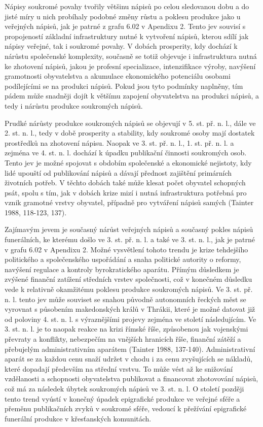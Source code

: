 Nápisy soukromé povahy tvořily většinu nápisů po celou sledovanou dobu a do jisté míry u nich probíhaly podobné změny růstu a poklesu produkce jako u veřejných nápisů, jak je patrné z grafu 6.02 v Apendixu 2. Tento jev souvisí s propojeností základní infrastruktury nutné k vytvoření nápisů, kterou sdílí jak nápisy veřejné, tak i soukromé povahy. V dobách prosperity, kdy dochází k nárůstu společenské komplexity, současně se totiž objevuje i infrastruktura nutná ke zhotovení nápisů, jakou je profesní specializace, intenzifikace výroby, navýšení gramotnosti obyvatelstva a akumulace ekonomického potenciálu osobami podílejícími se na produkci nápisů. Pokud jsou tyto podmínky naplněny, tím pádem může snadněji dojít k většímu zapojení obyvatelstva na produkci nápisů, a tedy i nárůstu produkce soukromých nápisů.

Prudké nárůsty produkce soukromých nápisů se objevují v 5. st. př. n. l., dále ve 2. st. n. l., tedy v době prosperity a stability, kdy soukromé osoby mají dostatek prostředků na zhotovení nápisu. Naopak ve 3. st. př. n. l., 1. st. př. n. l. a zejména ve 4. st. n. l. dochází k úpadku publikační činnosti soukromých osob. Tento jev je možné spojovat s obdobím společenské a ekonomické nejistoty, kdy lidé upouští od publikování nápisů a dávají přednost zajištění primárních životních potřeb. V těchto dobách také může klesat počet obyvatel schopných psát, spolu s tím, jak v dobách krize mizí i nutná infrastruktura potřebná pro vznik gramotné vrstvy obyvatel, případně pro vytváření nápisů samých (Tainter 1988, 118-123, 137).

Zajímavým jevem je současný nárůst veřejných nápisů a současný pokles nápisů funerálních, ke kterému došlo ve 3. st. př. n. l. a také ve 3. st. n. l., jak je patrné v grafu 6.02 v Apendixu 2. Možné vysvětlení tohoto trendu je krize tehdejšího politického a společenského uspořádání a snaha politické autority o reformy, navýšení regulace a kontroly byrokratického aparátu. Přímým důsledkem je zvýšené finanční zatížení středních vrstev společnosti, což v konečném důsledku vede k relativně okamžitému poklesu produkce soukromých nápisů. Ve 3. st. př. n. l. tento jev může souviset se snahou původně autonomních řeckých měst se vyrovnat s působením makedonských králů v Thrákii, které je možné datovat již od poloviny 4. st. n. l. s výraznějšími projevy zejména ve století následujícím. Ve 3. st. n. l. je to naopak reakce na krizi římské říše, způsobenou jak vojenskými převraty a konflikty, nebezpečím na vnějších hranicích říše, finanční zátěží a přebujelým administrativním aparátem (Tainter 1988, 137-140). Administrativní aparát se za každou cenu snaží udržet v chodu i za cenu zvyšujících se nákladů, které dopadají především na střední vrstvu. To může vést až ke snižování vzdělanosti a schopnosti obyvatelstva publikovat a financovat zhotovování nápisů, což má za následek úbytek soukromých nápisů ve 3. st. n. l. O století později tento trend vyústí v konečný úpadek epigrafické produkce ve veřejné sféře a přeměnu publikačních zvyků v soukromé sféře, vedoucí k přežívání epigrafické funerální produkce v křesťanských komunitách.

